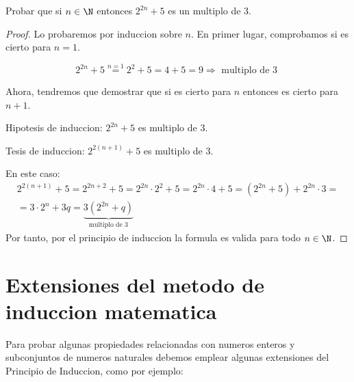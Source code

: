 \begin{example}
	Probar que si \(n \in  \N \) entonces \(2^{2n} + 5 \) es un multiplo de 3.
\end{example}
\begin{proof}
	Lo probaremos por induccion sobre \(n \). En primer lugar, comprobamos si es cierto para \(n = 1\).

	\[
		2^{2n} + 5 \overset{n=1}{=} 2^{2} + 5 = 4 + 5 = 9 \Rightarrow \text{ multiplo de 3 }
	\]

	Ahora, tendremos que demostrar que si es cierto para \(n \) entonces es cierto para \(n + 1 \).

	Hipotesis de induccion: \(2^{2n} + 5 \) es multiplo de 3.

	Tesis de induccion: \(2^{2(n+1)} + 5\) es multiplo de 3.

	En este caso:
	\begin{multline*}
		2^{2(n+1)} + 5 = 2^{2n + 2} + 5 = 2^{2n} \cdot 2^{2} + 5 = 2^{2n} \cdot 4 + 5 = (2^{2n} + 5 ) + 2^{2n} \cdot 3 = \\
		= 3 \cdot 2^{n} + 3q = \underbrace{3(2^{2n} + q)}_{\text{multiplo de 3}}
	\end{multline*}
	Por tanto, por el principio de induccion la formula es valida para todo \(n \in  \N \).
\end{proof}

\section{Extensiones del metodo de induccion matematica}

Para probar algunas propiedades relacionadas con numeros enteros y subconjuntos de numeros naturales debemos emplear algunas extensiones del Principio de Induccion, como por ejemplo:

